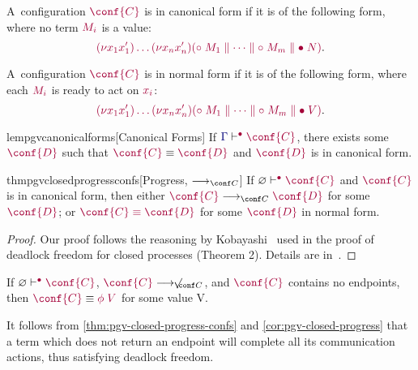 \documentclass[main.tex]{subfiles}
\begin{document}
\begin{compacttheorems}
  \begin{definition}
    \label{def:pgv-canonical-forms}
    A~configuration $\tm{\conf{C}}$ is in canonical form if it is of the following form, where no term $\tm{M_i}$ is a value:
    \[
      \tm{\res{x_1}{x'_1}{\dots\res{x_n}{x'_n}{(\child\;M_1\parallel\dots\parallel\child\;M_m\parallel\main\;N)}}}.
    \]
  \end{definition}
  \begin{definition}
    A~configuration $\tm{\conf{C}}$ is in normal form if it is of the following form, where each $\tm{M_i}$ is ready to act on $\tm{x_i}$:
    \[
      \tm{\res{x_1}{x'_1}{\dots\res{x_n}{x'_n}{(\child\;M_1\parallel\dots\parallel\child\;M_m\parallel\main\;V)}}}.
    \]
  \end{definition}
  \begin{restatablelemma}{lempgvcanonicalforms}[Canonical Forms]
    \label{lem:pgv-canonical-forms}
    If $\cseq[\main]{\ty{\Gamma}}{\conf{C}}$, there exists some $\tm{\conf{D}}$ such that $\tm{\conf{C}}\equiv\tm{\conf{D}}$ and $\tm{\conf{D}}$ is in canonical form.
  \end{restatablelemma}
  \begin{restatabletheorem}{thmpgvclosedprogressconfs}[Progress, $\cred$]
    \label{thm:pgv-closed-progress-confs}
    If $\cseq[\main]{\emptyenv}{\conf{C}}$ and $\tm{\conf{C}}$ is in canonical form, then either $\tm{\conf{C}}\cred\tm{\conf{D}}$ for some $\tm{\conf{D}}$; or $\tm{\conf{C}\equiv\conf{D}}$ for some $\tm{\conf{D}}$ in normal form.
  \end{restatabletheorem}
  \begin{proof}
    Our proof follows the reasoning by Kobayashi~\cite{kobayashi06} used in the proof of deadlock freedom for closed processes (Theorem 2). Details are in~.
  \end{proof}
  \begin{corollary}
    \label{cor:pgv-closed-progress}
    If $\cseq[\main]{\emptyenv}{\conf{C}}$, $\tm{\conf{C}}\centernot\cred$, and $\tm{\conf{C}}$ contains no endpoints, then $\tm{\conf{C}}\equiv\tm{\phi\;V}$ for some value V.
  \end{corollary}
\end{compacttheorems}
It follows from \cref{thm:pgv-closed-progress-confs} and \cref{cor:pgv-closed-progress} that a term which does not return an endpoint will complete all its communication actions, thus satisfying deadlock freedom.
\end{document}
